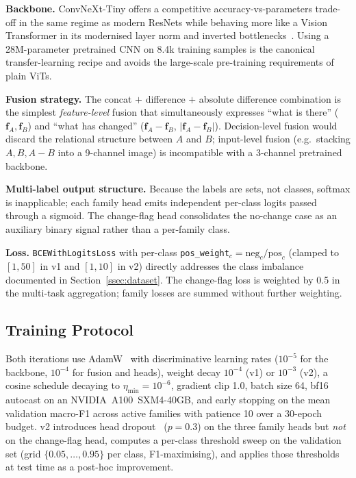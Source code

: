 \documentclass[journal]{IEEEtran}
\begin{document}
\textbf{Backbone.} ConvNeXt-Tiny offers a competitive accuracy-vs-parameters trade-off in the same regime as modern ResNets while behaving more like a Vision Transformer in its modernised layer norm and inverted bottlenecks~\cite{liu2022convnext}. Using a 28M-parameter pretrained CNN on 8.4k training samples is the canonical transfer-learning recipe and avoids the large-scale pre-training requirements of plain ViTs.

\textbf{Fusion strategy.} The concat $+$ difference $+$ absolute difference combination is the simplest \emph{feature-level} fusion that simultaneously expresses ``what is there'' ($\mathbf{f}_A,\mathbf{f}_B$) and ``what has changed'' ($\mathbf{f}_A{-}\mathbf{f}_B$, $|\mathbf{f}_A{-}\mathbf{f}_B|$). Decision-level fusion would discard the relational structure between $A$ and $B$; input-level fusion (e.g.~stacking $A,B,A{-}B$ into a 9-channel image) is incompatible with a 3-channel pretrained backbone.

\textbf{Multi-label output structure.} Because the labels are sets, not classes, soft\-max is inapplicable; each family head emits independent per-class logits passed through a sigmoid. The change-flag head consolidates the no-change case as an auxiliary binary signal rather than a per-family class.

\textbf{Loss.} \texttt{BCEWithLogitsLoss} with per-class \texttt{pos\_weight}$_c = \text{neg}_c / \text{pos}_c$ (clamped to $[1,50]$ in v1 and $[1,10]$ in v2) directly addresses the class imbalance documented in Section~\ref{ssec:dataset}. The change-flag loss is weighted by 0.5 in the multi-task aggregation; family losses are summed without further weighting.

\subsection{Training Protocol}\label{ssec:training}

Both iterations use AdamW~\cite{loshchilov2019adamw} with discriminative learning rates ($10^{-5}$ for the backbone, $10^{-4}$ for fusion and heads), weight decay $10^{-4}$ (v1) or $10^{-3}$ (v2), a cosine schedule decaying to $\eta_{\min}{=}10^{-6}$, gradient clip 1.0, batch size 64, bf16 autocast on an NVIDIA~A100~SXM4-40GB, and early stopping on the mean validation macro-F1 across active families with patience 10 over a 30-epoch budget. v2 introduces head dropout~\cite{srivastava2014dropout} ($p{=}0.3$) on the three family heads but \emph{not} on the change-flag head, computes a per-class threshold sweep on the validation set (grid $\{0.05,\ldots,0.95\}$ per class, F1-maximising), and applies those thresholds at test time as a post-hoc improvement.
\end{document}
